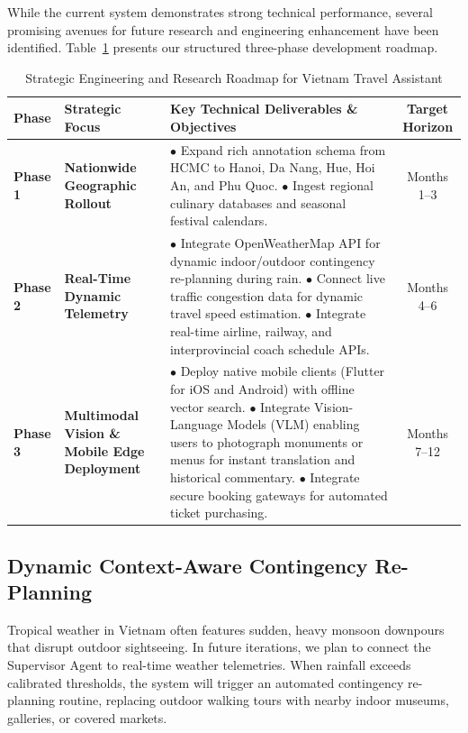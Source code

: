 While the current system demonstrates strong technical performance, several promising avenues for future research and engineering enhancement have been identified. Table~\ref{tab:roadmap} presents our structured three-phase development roadmap.

\begin{table}[htbp]
    \centering
    \caption{Strategic Engineering and Research Roadmap for Vietnam Travel Assistant}
    \label{tab:roadmap}
    \renewcommand{\arraystretch}{1.3}
    \begin{tabularx}{\textwidth}{l p{3.2cm} X c}
        \toprule
        \textbf{Phase} & \textbf{Strategic Focus} & \textbf{Key Technical Deliverables \& Objectives} & \textbf{Target Horizon} \\
        \midrule
        \textbf{Phase 1} & \textbf{Nationwide Geographic Rollout} & 
        $\bullet$ Expand rich annotation schema from HCMC to Hanoi, Da Nang, Hue, Hoi An, and Phu Quoc. \newline
        $\bullet$ Ingest regional culinary databases and seasonal festival calendars. & Months 1--3 \\
        \midrule
        \textbf{Phase 2} & \textbf{Real-Time Dynamic Telemetry} & 
        $\bullet$ Integrate OpenWeatherMap API for dynamic indoor/outdoor contingency re-planning during rain. \newline
        $\bullet$ Connect live traffic congestion data for dynamic travel speed estimation. \newline
        $\bullet$ Integrate real-time airline, railway, and interprovincial coach schedule APIs. & Months 4--6 \\
        \midrule
        \textbf{Phase 3} & \textbf{Multimodal Vision \& Mobile Edge Deployment} & 
        $\bullet$ Deploy native mobile clients (Flutter for iOS and Android) with offline vector search. \newline
        $\bullet$ Integrate Vision-Language Models (VLM) enabling users to photograph monuments or menus for instant translation and historical commentary. \newline
        $\bullet$ Integrate secure booking gateways for automated ticket purchasing. & Months 7--12 \\
        \bottomrule
    \end{tabularx}
\end{table}

\subsection{Dynamic Context-Aware Contingency Re-Planning}
Tropical weather in Vietnam often features sudden, heavy monsoon downpours that disrupt outdoor sightseeing. In future iterations, we plan to connect the Supervisor Agent to real-time weather telemetries. When rainfall exceeds calibrated thresholds, the system will trigger an automated contingency re-planning routine, replacing outdoor walking tours with nearby indoor museums, galleries, or covered markets.

